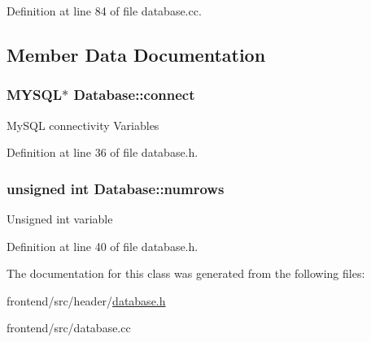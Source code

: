 Definition at line 84 of file database.\-cc.



\subsection{Member Data Documentation}
\hypertarget{classDatabase_aa232b806b05ef654cd5579bca5f1dbad}{
\subsubsection[{connect}]{\setlength{\rightskip}{0pt plus 5cm}M\-Y\-S\-Q\-L$\ast$ Database\-::connect\hspace{0.3cm}{\ttfamily [protected]}}}\label{classDatabase_aa232b806b05ef654cd5579bca5f1dbad}
My\-S\-Q\-L connectivity Variables 

Definition at line 36 of file database.\-h.

\hypertarget{classDatabase_a02965883689dd1d8007c86cebf6df89e}{
\subsubsection[{numrows}]{\setlength{\rightskip}{0pt plus 5cm}unsigned int Database\-::numrows\hspace{0.3cm}{\ttfamily [protected]}}}\label{classDatabase_a02965883689dd1d8007c86cebf6df89e}
Unsigned int variable 

Definition at line 40 of file database.\-h.



The documentation for this class was generated from the following files\-:\begin{DoxyCompactItemize}
\item 
frontend/src/header/\hyperlink{database_8h}{database.\-h}\item 
frontend/src/database.\-cc\end{DoxyCompactItemize}

